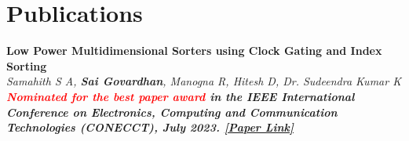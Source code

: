 \section{\sc Publications}

{\bf{Low Power Multidimensional Sorters using Clock Gating and Index Sorting}} \\
\textit{Samahith S A, {\bf{Sai Govardhan}}, Manogna R, Hitesh D, Dr. Sudeendra Kumar K \\
  \bf \textcolor{red} {\textit{{Nominated for the best paper award}}} in the IEEE International Conference on Electronics, Computing and Communication Technologies (CONECCT), July 2023.  
  {\bf \href{https://ieeexplore.ieee.org/document/10234758}{[Paper Link]}}}

\endinput
